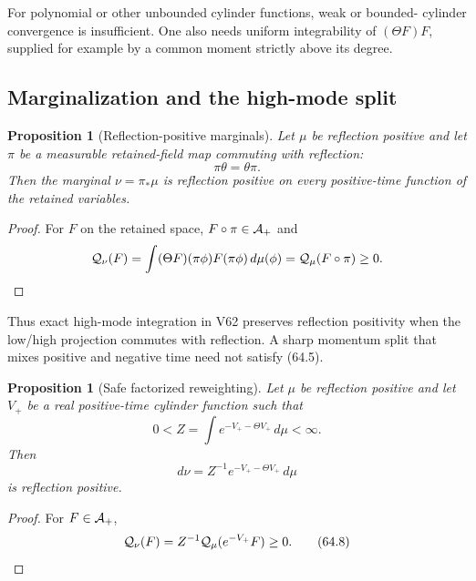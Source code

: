 \documentclass[11pt]{article}
\newtheorem{proposition}[theorem]{Proposition}
\begin{document}
\begin{warning}
\label{warn:v11v64-unbounded}
For polynomial or other unbounded cylinder functions, weak or bounded-
cylinder convergence is insufficient.  One also needs uniform
integrability of \((\Theta F)F\), supplied for example by a common
moment strictly above its degree.
\end{warning}

\subsection{Marginalization and the high-mode split}

\begin{proposition}[Reflection-positive marginals]
\label{prop:v11v64-marginal}
Let \(\mu\) be reflection positive and let
\(\pi\) be a measurable retained-field map commuting with reflection:
\[
                              \pi\theta=\theta\pi.             \tag{64.5}
\]
Then the marginal \(\nu=\pi_*\mu\) is reflection positive on every
positive-time function of the retained variables.
\end{proposition}

\begin{proof}
For \(F\) on the retained space, \(F\circ\pi\in{\cal A}_+\) and
\[
 {\cal Q}_\nu(F)
 =\int(\Theta F)(\pi\phi)F(\pi\phi)\,d\mu(\phi)
 ={\cal Q}_\mu(F\circ\pi)\ge0.
\]
\end{proof}

Thus exact high-mode integration in V62 preserves reflection
positivity when the low/high projection commutes with reflection.
A sharp momentum split that mixes positive and negative time need not
satisfy (64.5).

\begin{proposition}[Safe factorized reweighting]
\label{prop:v11v64-reweight}
Let \(\mu\) be reflection positive and let \(V_+\) be a real
positive-time cylinder function such that
\[
                         0<Z=\int e^{-V_+-\Theta V_+}\,d\mu<\infty.
                                                                  \tag{64.6}
\]
Then
\[
                         d\nu=Z^{-1}e^{-V_+-\Theta V_+}\,d\mu \tag{64.7}
\]
is reflection positive.
\end{proposition}

\begin{proof}
For \(F\in{\cal A}_+\),
\[
 {\cal Q}_\nu(F)
 =Z^{-1}{\cal Q}_\mu(e^{-V_+}F)\ge0.                          \tag{64.8}
\]
\end{proof}
\end{document}
